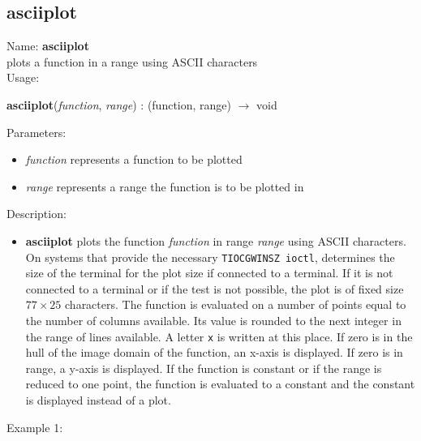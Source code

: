 \subsection{asciiplot}
\label{labasciiplot}
\noindent Name: \textbf{asciiplot}\\
plots a function in a range using ASCII characters\\
\noindent Usage: 
\begin{center}
\textbf{asciiplot}(\emph{function}, \emph{range}) : (\textsf{function}, \textsf{range}) $\rightarrow$ \textsf{void}\\
\end{center}
Parameters: 
\begin{itemize}
\item \emph{function} represents a function to be plotted
\item \emph{range} represents a range the function is to be plotted in 
\end{itemize}
\noindent Description: \begin{itemize}

\item \textbf{asciiplot} plots the function \emph{function} in range \emph{range} using ASCII
   characters.  On systems that provide the necessary 
   \texttt{TIOCGWINSZ ioctl}, \sollya determines the size of the
   terminal for the plot size if connected to a terminal. If it is not
   connected to a terminal or if the test is not possible, the plot is of
   fixed size $77\times25$ characters.  The function is
   evaluated on a number of points equal to the number of columns
   available. Its value is rounded to the next integer in the range of
   lines available. A letter \texttt{x} is written at this place. If zero is in
   the hull of the image domain of the function, an x-axis is
   displayed. If zero is in range, a y-axis is displayed.  If the
   function is constant or if the range is reduced to one point, the
   function is evaluated to a constant and the constant is displayed
   instead of a plot.
\end{itemize}
\noindent Example 1: 
